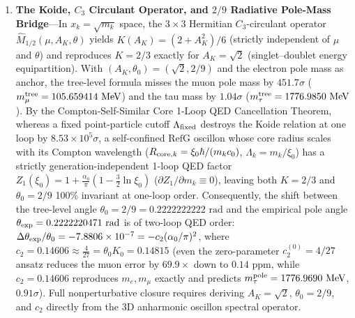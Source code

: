 \documentclass[11pt,a4paper]{article}
\newcommand{\RefG}{\mathrm{RefG}}
\begin{document}
\begin{enumerate}[label=\arabic*.]
\item \textbf{The Koide, $C_3$ Circulant Operator, and $2/9$ Radiative Pole-Mass Bridge}---In $x_k=\sqrt{m_k}$ space, the $3\times 3$ Hermitian $C_3$-circulant operator $\widehat{M}_{1/2}(\mu, A_K, \theta)$ yields $K(A_K) = (2+A_K^2)/6$ (strictly independent of $\mu$ and $\theta$) and reproduces $K=2/3$ exactly for $A_K=\sqrt2$ (singlet--doublet energy equipartition). With $(A_K,\theta_0)=(\sqrt2,2/9)$ and the electron pole mass as anchor, the tree-level formula misses the muon pole mass by $451.7\sigma$ ($m_\mu^{\rm tree} = 105.659414\text{ MeV}$) and the tau mass by $1.04\sigma$ ($m_\tau^{\rm tree} = 1776.9850\text{ MeV}$). By the Compton-Self-Similar Core 1-Loop QED Cancellation Theorem, whereas a fixed point-particle cutoff $\Lambda_{\rm fixed}$ destroys the Koide relation at one loop by $8.53\times 10^5\sigma$, a self-confined $\RefG$ oscillon whose core radius scales with its Compton wavelength ($R_{{\rm core},k} = \xi_0\hbar/(m_k c_0)$, $\Lambda_k = m_k/\xi_0$) has a strictly generation-independent 1-loop QED factor $Z_1(\xi_0) = 1 + \frac{\alpha_0}{\pi}(1 - \frac{3}{2}\ln\xi_0)$ ($\partial Z_1/\partial m_k \equiv 0$), leaving both $K=2/3$ and $\theta_0 = 2/9$ 100\% invariant at one-loop order. Consequently, the shift between the tree-level angle $\theta_0 = 2/9 = 0.2222222222\text{ rad}$ and the empirical pole angle $\theta_{\rm exp} = 0.2222220471\text{ rad}$ is of two-loop QED order: $\Delta\theta_{\rm exp}/\theta_0 = -7.8806\times 10^{-7} = -c_2(\alpha_0/\pi)^2$, where $c_2 = 0.14606 \approx \frac{4}{27} = \theta_0 K_0 = 0.14815$ (even the zero-parameter $c_2^{(0)} = 4/27$ ansatz reduces the muon error by $69.9\times$ down to $0.14\text{ ppm}$, while $c_2 = 0.14606$ reproduces $m_e, m_\mu$ exactly and predicts $m_\tau^{\rm pole} = 1776.9690\text{ MeV}$, $0.91\sigma$). Full nonperturbative closure requires deriving $A_K=\sqrt{2}$, $\theta_0=2/9$, and $c_2$ directly from the 3D anharmonic oscillon spectral operator.


\end{enumerate}
\end{document}
